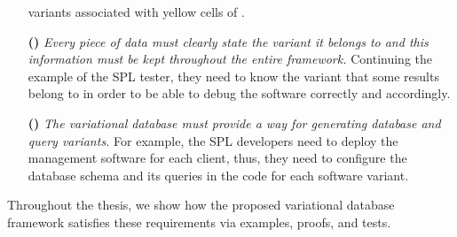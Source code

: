 \begin{enumerate}
 variants associated with yellow cells of . 
%
%
%
\item [\textbf{(\nTwo)}]
\emph{Every piece of data must clearly state the variant it belongs to and 
this information must be kept throughout the entire framework.}
Continuing the example of the SPL tester, they need to know the variant that
some results belong to in order to be able to debug the software correctly and
accordingly. 
%
%
%
\item [\textbf{(\nThree)}]
\emph{The variational database must provide a way for generating database
and query variants.}
For example, the SPL developers need to deploy the management software for each client,
thus, they need to configure the database schema and its queries in the code 
for each software variant.  
%
%
%
\end{enumerate}

Throughout the thesis,
we show how the proposed variational database framework satisfies these requirements 
via examples, proofs, and tests.

